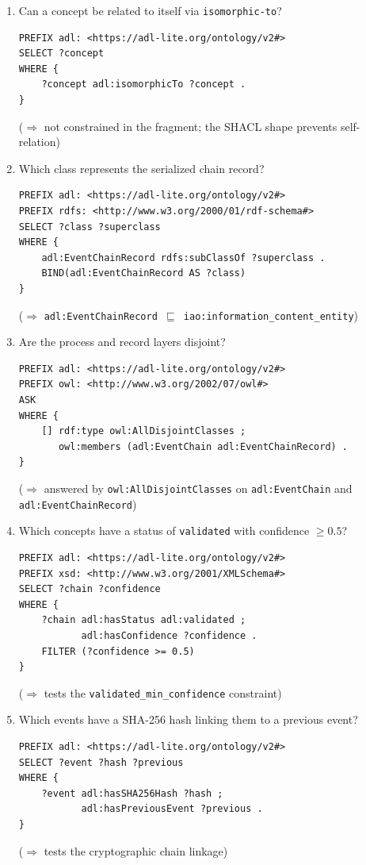 \begin{enumerate}[label=CQ\arabic*:,leftmargin=3em]
    \item Can a concept be related to itself via \texttt{isomorphic-to}?
    \begin{verbatim}
PREFIX adl: <https://adl-lite.org/ontology/v2#>
SELECT ?concept
WHERE {
    ?concept adl:isomorphicTo ?concept .
}
    \end{verbatim}
    ($\Rightarrow$ not constrained in the fragment; the SHACL shape prevents self-relation)

    \item Which class represents the serialized chain record?
    \begin{verbatim}
PREFIX adl: <https://adl-lite.org/ontology/v2#>
PREFIX rdfs: <http://www.w3.org/2000/01/rdf-schema#>
SELECT ?class ?superclass
WHERE {
    adl:EventChainRecord rdfs:subClassOf ?superclass .
    BIND(adl:EventChainRecord AS ?class)
}
    \end{verbatim}
    ($\Rightarrow$ \texttt{adl:EventChainRecord $\sqsubseteq$ iao:information\_content\_entity})

    \item Are the process and record layers disjoint?
    \begin{verbatim}
PREFIX adl: <https://adl-lite.org/ontology/v2#>
PREFIX owl: <http://www.w3.org/2002/07/owl#>
ASK
WHERE {
    [] rdf:type owl:AllDisjointClasses ;
       owl:members (adl:EventChain adl:EventChainRecord) .
}
    \end{verbatim}
    ($\Rightarrow$ answered by \texttt{owl:AllDisjointClasses} on \texttt{adl:EventChain} and \texttt{adl:EventChainRecord})

    \item Which concepts have a status of \texttt{validated} with confidence $\geq 0.5$?
    \begin{verbatim}
PREFIX adl: <https://adl-lite.org/ontology/v2#>
PREFIX xsd: <http://www.w3.org/2001/XMLSchema#>
SELECT ?chain ?confidence
WHERE {
    ?chain adl:hasStatus adl:validated ;
           adl:hasConfidence ?confidence .
    FILTER (?confidence >= 0.5)
}
    \end{verbatim}
    ($\Rightarrow$ tests the \texttt{validated\_min\_confidence} constraint)

    \item Which events have a SHA-256 hash linking them to a previous event?
    \begin{verbatim}
PREFIX adl: <https://adl-lite.org/ontology/v2#>
SELECT ?event ?hash ?previous
WHERE {
    ?event adl:hasSHA256Hash ?hash ;
           adl:hasPreviousEvent ?previous .
}
    \end{verbatim}
    ($\Rightarrow$ tests the cryptographic chain linkage)


\end{enumerate}
